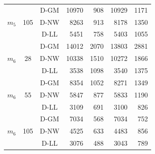 \begin{table}[htbp]
{\begin{tabular}{ccccccc}
\multirow{3}{*}{$m_5$} & \multirow{3}{*}{105}
   & D-GM & 10970 & ~908 & 10929 & 1171 \\
   &    & D-NW & ~8263 & ~913 & ~8178 & 1350 \\
   &    & D-LL & ~5451 & ~758 & ~5403 & 1055 \\
\toprule
\multirow{3}{*}{$m_6$} & \multirow{3}{*}{28}
   & D-GM & 14012 & 2070 & 13803 & 2881 \\
   &    & D-NW & 10338 & 1510 & 10272 & 1866 \\
   &    & D-LL & ~3538 & 1098 & ~3540 & 1375 \\
\midrule
\multirow{3}{*}{$m_6$} & \multirow{3}{*}{55}
   & D-GM & ~8354 & 1052 & ~8271 & 1349 \\
   &    & D-NW & ~5847 & ~877 & ~5833 & 1190 \\
   &    & D-LL & ~3109 & ~691 & ~3100 & ~826 \\
\midrule
\multirow{3}{*}{$m_6$} & \multirow{3}{*}{105}
   & D-GM & ~7034 & ~568 & ~7034 & ~752 \\
   &    & D-NW & ~4525 & ~633 & ~4483 & ~856 \\
   &    & D-LL & ~3076 & ~488 & ~3043 & ~789 \\
\bottomrule
\end{tabular}}
\end{table}
